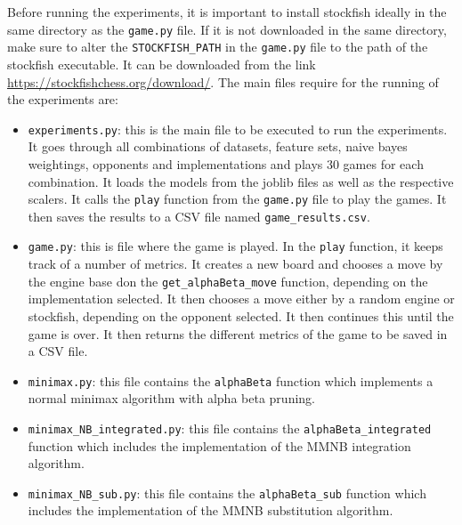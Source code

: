 Before running the experiments, it is important to install stockfish ideally in the same directory as the \texttt{game.py} file. If it is not downloaded in the same directory, make sure to alter the \texttt{STOCKFISH\_PATH} in the \texttt{game.py} file to the path of the stockfish executable. It can be downloaded from the link \url{https://stockfishchess.org/download/}.
The main files require for the running of the experiments are:

\begin{itemize}
    \item \texttt{experiments.py}: this is the main file to be executed to run the experiments. It goes through all combinations of datasets, feature sets, naive bayes weightings, opponents and implementations and plays 30 games for each combination. It loads the models from the joblib files as well as the respective scalers. It calls the \texttt{play} function from the \texttt{game.py} file to play the games. It then saves the results to a CSV file named \texttt{game\_results.csv}.
    \item \texttt{game.py}: this is file where the game is played. In the \texttt{play} function, it keeps track of a number of metrics. It creates a new board and chooses a move by the engine base don the \texttt{get\_alphaBeta\_move} function, depending on the implementation selected. It then chooses a move either by a random engine or stockfish, depending on the opponent selected. It then continues this until the game is over. It then returns the different metrics of the game to be saved in a CSV file. 
    \item \texttt{minimax.py}: this file contains the \texttt{alphaBeta} function which implements a normal minimax algorithm with alpha beta pruning.
    \item \texttt{minimax\_NB\_integrated.py}: this file contains the \texttt{alphaBeta\_integrated} function which includes the implementation of the MMNB integration algorithm.
    \item \texttt{minimax\_NB\_sub.py}: this file contains the \texttt{alphaBeta\_sub} function which includes the implementation of the MMNB substitution algorithm.
\end{itemize}



